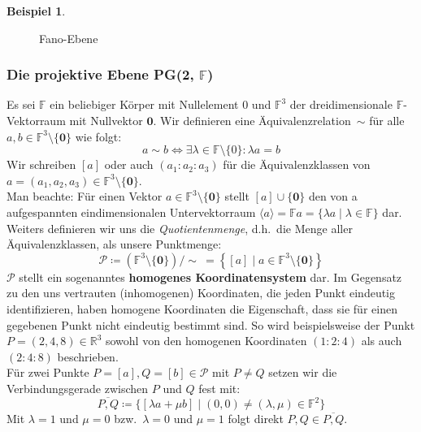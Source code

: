 \documentclass[hidelinks]{article}
\theoremstyle{plain}
\theoremstyle{definition}
\newtheorem{bsp}[thm]{Beispiel}
\theoremstyle{rem}
\newcommand{\pgtwo}{PG(2, $\mathbb{F}$)\ }
\newcommand{\fnz}{\mathbb{F}\setminus\{0\}}
\newcommand{\ftnz}{\mathbb{F}^{3}\setminus\{\boldsymbol 0\}}
\begin{document}
\begin{sloppypar}
\begin{bsp}
\begin{figure}[H]
\caption{Fano-Ebene}
\end{figure}
\end{bsp}


\subsubsection{Die projektive Ebene \pgtwo}
Es sei $\mathbb{F}$ ein beliebiger Körper mit Nullelement $0$ und $\mathbb{F}^3$ der dreidimensionale $\mathbb{F}$-Vektorraum mit Nullvektor $\boldsymbol 0$. Wir definieren eine Äquivalenzrelation~$\sim$ für alle $a,b\in\ftnz$ wie folgt:\\
\begin{equation*}
	a\sim b \Leftrightarrow \exists\lambda\in\fnz:\lambda a=b
\end{equation*}
Wir schreiben $[a]$ oder auch $(a_1:a_2:a_3)$ für die Äquivalenzklassen von $a=(a_1,a_2,a_3)\in\ftnz$.\\
Man beachte: Für einen Vektor $a\in\ftnz$ stellt $[a]\cup\{\boldsymbol 0\}$ den von a aufgespannten eindimensionalen Untervektorraum $\langle a \rangle=\mathbb{F}a=\{\lambda a\mid\lambda\in\mathbb{F}\}$ dar.\\

Weiters definieren wir uns die \textit{Quotientenmenge}, d.h.\ die Menge aller Äquivalenzklassen, als unsere Punktmenge:
\begin{equation*}
	\mathcal{P}\coloneqq(\ftnz)/\sim\ = \left \{[a]\mid a\in\ftnz\right \}
\end{equation*}
$\mathcal{P}$ stellt ein sogenanntes \textbf{homogenes Koordinatensystem} dar. Im Gegensatz zu den uns vertrauten (inhomogenen) Koordinaten, die jeden Punkt eindeutig identifizieren, haben homogene Koordinaten die Eigenschaft, dass sie für einen gegebenen Punkt nicht eindeutig bestimmt sind. So wird beispielsweise der Punkt $P=(2,4,8)\in\mathbb{R}^3$ sowohl von den homogenen Koordinaten $(1:2:4)$ als auch $(2:4:8)$ beschrieben.\\

Für zwei Punkte $P=[a],Q=[b]\in\mathcal{P}$ mit $P\ne Q$ setzen wir die Verbindungsgerade zwischen $P$ und $Q$ fest mit:
\begin{equation*}
	\overline{P,Q}\coloneqq\bigl \{[\lambda a+\mu b]\mid (0,0)\ne(\lambda,\mu)\in\mathbb{F}^2\bigr \}
\end{equation*}
Mit $\lambda=1$ und $\mu=0$ bzw.\ $\lambda=0$ und $\mu=1$ folgt direkt $P,Q\in\overline{P,Q}$.\\


\end{sloppypar}
\end{document}
